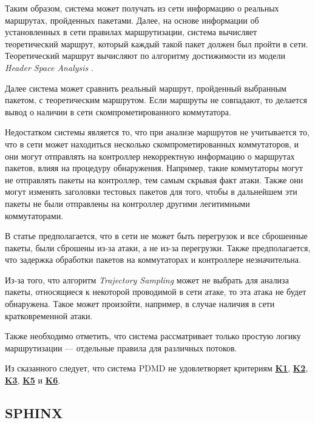 \documentclass[../thesis.tex]{subfiles}
\begin{document}
Таким образом, система может получать из сети информацию о реальных маршрутах, пройденных пакетами.
Далее, на основе информации об установленных в сети правилах маршрутизации, система вычисляет теоретический маршрут, который каждый такой пакет должен был пройти в сети.
Теоретический маршрут вычисляют по алгоритму достижимости из модели \textit{Header Space Analysis} \cite{kazemian2012header}.

Далее система может сравнить реальный маршрут, пройденный выбранным пакетом, с теоретическим маршрутом.
Если маршруты не совпадают, то делается вывод о наличии в сети скомпрометированного коммутатора.

Недостатком системы является то, что при анализе маршрутов не учитывается то, что в сети может находиться несколько скомпрометированных коммутаторов, и они могут отправлять на контроллер некорректную информацию о маршрутах пакетов, влияя на процедуру обнаружения.
Например, такие коммутаторы могут не отправлять пакеты на контроллер, тем самым скрывая факт атаки.
Также они могут изменять заголовки тестовых пакетов для того, чтобы в дальнейшем эти пакеты не были отправлены на контроллер другими легитимными коммутаторами.

В статье \cite{mohammadi2016detecting} предполагается, что в сети не может быть перегрузок и все сброшенные пакеты, были сброшены из-за атаки, а не из-за перегрузки.
Также предполагается, что задержка обработки пакетов на коммутаторах и контроллере незначительна.

Из-за того, что алгоритм \textit{Trajectory Sampling} \cite{duffield2001trajectory} может не выбрать для анализа пакеты, относящиеся к некоторой проводимой в сети атаке, то эта атака не будет обнаружена.
Такое может произойти, например, в случае наличия в сети кратковременной атаки.

Также необходимо отметить, что система рассматривает только простую логику маршрутизации --- отдельные правила для различных потоков.

{
\hypersetup{linkcolor=black}

Из сказанного следует, что система PDMD не удовлетворяет критериям \hyperref[criterion:K1]{\textbf{K1}}, \hyperref[criterion:K2]{\textbf{K2}}, \hyperref[criterion:K3]{\textbf{K3}}, \hyperref[criterion:K5]{\textbf{K5}} и \hyperref[criterion:K6]{\textbf{K6}}.
}

\subsection{SPHINX} \label{subsection:sphinx}
\end{document}
